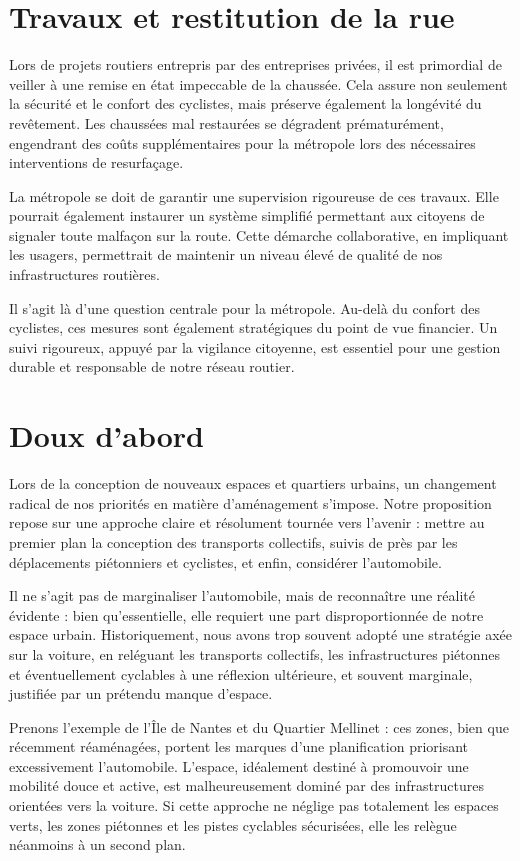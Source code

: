 \section{Travaux et restitution de la rue}

Lors de projets routiers entrepris par des entreprises privées, il est
primordial de veiller à une remise en état impeccable de la
chaussée. Cela assure non seulement la sécurité et le confort des
cyclistes, mais préserve également la longévité du revêtement. Les
chaussées mal restaurées se dégradent prématurément, engendrant des
coûts supplémentaires pour la métropole lors des nécessaires
interventions de resurfaçage.

La métropole se doit de garantir une supervision rigoureuse de ces
travaux. Elle pourrait également instaurer un système simplifié
permettant aux citoyens de signaler toute malfaçon sur la route. Cette
démarche collaborative, en impliquant les usagers, permettrait de
maintenir un niveau élevé de qualité de nos infrastructures routières.

Il s'agit là d'une question centrale pour la métropole. Au-delà du
confort des cyclistes, ces mesures sont également stratégiques du
point de vue financier. Un suivi rigoureux, appuyé par la vigilance
citoyenne, est essentiel pour une gestion durable et responsable de
notre réseau routier.

\section{Doux d’abord}

Lors de la conception de nouveaux espaces et quartiers urbains, un
changement radical de nos priorités en matière d'aménagement
s'impose. Notre proposition repose sur une approche claire et
résolument tournée vers l'avenir : mettre au premier plan la
conception des transports collectifs, suivis de près par les
déplacements piétonniers et cyclistes, et enfin, considérer
l'automobile.

Il ne s'agit pas de marginaliser l'automobile, mais de reconnaître une
réalité évidente : bien qu'essentielle, elle requiert une part
disproportionnée de notre espace urbain. Historiquement, nous avons
trop souvent adopté une stratégie axée sur la voiture, en reléguant
les transports collectifs, les infrastructures piétonnes et
éventuellement cyclables à une réflexion ultérieure, et souvent
marginale, justifiée par un prétendu manque d'espace.

Prenons l'exemple de l'Île de Nantes et du Quartier Mellinet : ces
zones, bien que récemment réaménagées, portent les marques d'une
planification priorisant excessivement l'automobile. L'espace,
idéalement destiné à promouvoir une mobilité douce et active, est
malheureusement dominé par des infrastructures orientées vers la
voiture. Si cette approche ne néglige pas totalement les espaces
verts, les zones piétonnes et les pistes cyclables sécurisées, elle
les relègue néanmoins à un second plan.

